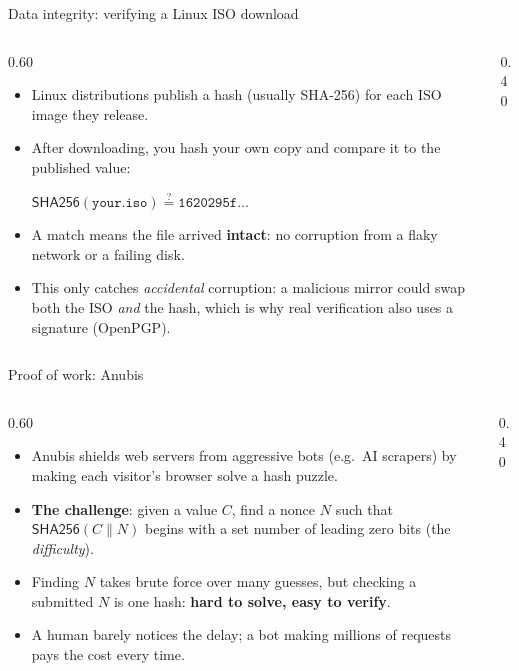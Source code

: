 \ifdefined\PRESENTATION\else\PassOptionsToClass{handout}{beamer}\fi\documentclass[aspectratio=169, lualatex]{beamer}
\begin{document}
\begin{frame}{Data integrity: verifying a Linux ISO download}
	\begin{columns}[c]
		\begin{column}{0.60\textwidth}
			\begin{itemize}
				\item Linux distributions publish a hash (usually SHA-256) for each ISO image they release.
				\item After downloading, you hash your own copy and compare it to the published value:
				      \begin{center}
					      {\small $\mathsf{SHA256}(\texttt{your.iso}) \stackrel{?}{=} \texttt{1620295f\ldots}$}
				      \end{center}
				\item A match means the file arrived \textbf{intact}: no corruption from a flaky network or a failing disk.
				\item This only catches \emph{accidental} corruption: a malicious mirror could swap both the ISO \emph{and} the hash, which is why real verification also uses a signature (OpenPGP).
			\end{itemize}
		\end{column}
		\begin{column}{0.40\textwidth}
		\end{column}
	\end{columns}
\end{frame}

\begin{frame}{Proof of work: Anubis}
	\begin{columns}[c]
		\begin{column}{0.60\textwidth}
			\begin{itemize}
				\item Anubis shields web servers from aggressive bots (e.g.\ AI scrapers) by making each visitor's browser solve a hash puzzle.
				\item \textbf{The challenge}: given a value $C$, find a nonce $N$ such that $\mathsf{SHA256}(C \| N)$ begins with a set number of leading zero bits (the \emph{difficulty}).
				\item Finding $N$ takes brute force over many guesses, but checking a submitted $N$ is one hash: \textbf{hard to solve, easy to verify}.
				\item A human barely notices the delay; a bot making millions of requests pays the cost every time.
			\end{itemize}
		\end{column}
		\begin{column}{0.40\textwidth}
		\end{column}
	\end{columns}
\end{frame}
\end{document}
